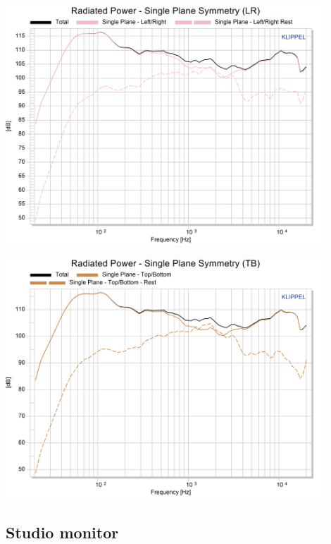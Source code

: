\documentclass{report}
\begin{document}
\begin{appendices}
\begin{minipage}{0.5\textwidth}
\begin{center}
	\includegraphics[width=0.9\textwidth]{Sym/BnO_RadPow_SpsLR}
    \captionsetup{hypcap=false}
\end{center}
\end{minipage}
\begin{minipage}{0.5\textwidth}
\begin{center}
	\includegraphics[width=0.9\textwidth]{Sym/BnO_RadPow_SpsTB}
    \captionsetup{hypcap=false}
\end{center}
\end{minipage}

\subsection{Studio monitor}
\label{Curves:studio}


\end{appendices}
\end{document}
